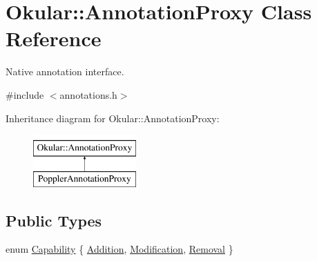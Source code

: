 \hypertarget{classOkular_1_1AnnotationProxy}{\section{Okular\+:\+:Annotation\+Proxy Class Reference}
\label{classOkular_1_1AnnotationProxy}
}


Native annotation interface.  




{\ttfamily \#include $<$annotations.\+h$>$}

Inheritance diagram for Okular\+:\+:Annotation\+Proxy\+:\begin{figure}[H]
\begin{center}
\leavevmode
\includegraphics[height=2.000000cm]{classOkular_1_1AnnotationProxy}
\end{center}
\end{figure}
\subsection*{Public Types}
\begin{DoxyCompactItemize}
\item 
enum \hyperlink{classOkular_1_1AnnotationProxy_ae89e16435aa7e10ac4089e673f44e543}{Capability} \{ \hyperlink{classOkular_1_1AnnotationProxy_ae89e16435aa7e10ac4089e673f44e543afd5f00fa1edfb9d2043f90f9938cee3a}{Addition}, 
\hyperlink{classOkular_1_1AnnotationProxy_ae89e16435aa7e10ac4089e673f44e543ac0cea5683bbb000686ad820c6cd885bf}{Modification}, 
\hyperlink{classOkular_1_1AnnotationProxy_ae89e16435aa7e10ac4089e673f44e543ace001445896cb9742c5282e4fa127936}{Removal}
 \}
\end{DoxyCompactItemize}
